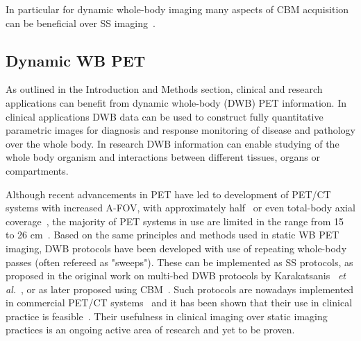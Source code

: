 In particular for dynamic whole-body imaging many aspects of CBM acquisition can be beneficial over SS imaging~\cite{Karakatsanis2016}.  

\subsection{Dynamic WB PET}
As outlined in the Introduction and Methods section, clinical and research applications can benefit from dynamic whole-body (DWB) PET information. In clinical applications DWB data can be used to construct fully quantitative parametric images for diagnosis and response monitoring of disease and pathology over the whole body. In research DWB information can enable studying of the whole body organism and interactions between different tissues, organs or compartments. 

Although recent advancements in PET have led to development of PET/CT systems with increased A-FOV, with approximately half~\cite{Karp2020,Siegel2020} or even total-body axial coverage~\cite{Cherry2018}, the majority of PET systems in use are limited in the range from 15 to 26 cm~\cite{Vandenberghe2020}. 
Based on the same principles and methods used in static WB PET imaging, DWB protocols have been developed with use of repeating whole-body passes (often refereed as "sweeps"). These can be implemented as SS protocols, as proposed in the original work on multi-bed DWB protocols by Karakatsanis ~\textit{et al.}~\cite{Karakatsanis2011,Karakatsanis2013}, or as later proposed using CBM~\cite{Karakatsanis2016,Hu2020}. Such protocols are nowadays implemented in commercial PET/CT systems~\cite{Hu2020} and it has been shown that their use in clinical practice is feasible~\cite{Fahrni2019,Dias2020}.  Their usefulness in clinical imaging over static imaging practices is an ongoing active area of research and yet to be proven. 

